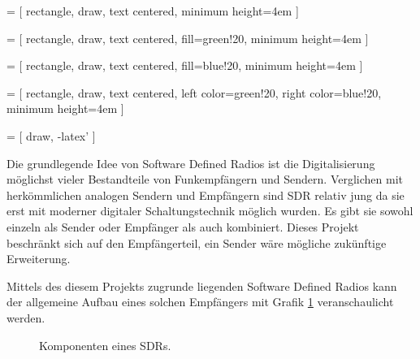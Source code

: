 
 = [
rectangle,
draw,
text centered,
minimum height=4em
]

 = [
rectangle,
draw,
text centered,
fill=green!20,
minimum height=4em
]

 = [
rectangle,
draw,
text centered,
fill=blue!20,
minimum height=4em
]

 = [
rectangle,
draw,
text centered,
left color=green!20,
right color=blue!20,
minimum height=4em
]


 = [
draw,
-latex'
]


Die grundlegende Idee von Software Defined Radios ist die Digitalisierung möglichst vieler Bestandteile von Funkempfängern und Sendern. Verglichen mit herkömmlichen analogen Sendern und Empfängern sind SDR relativ jung da sie erst mit moderner digitaler Schaltungstechnik möglich wurden. Es gibt sie sowohl einzeln als Sender oder Empfänger als auch kombiniert. Dieses Projekt beschränkt sich auf den Empfängerteil, ein Sender wäre mögliche zukünftige Erweiterung.

Mittels des diesem Projekts zugrunde liegenden Software Defined Radios kann der allgemeine Aufbau eines solchen Empfängers mit Grafik \ref{fig:SDR_aufbau} veranschaulicht werden.

\begin{figure}[H]
\begin{center}
    \caption{Komponenten eines SDRs.}
    \label{fig:SDR_aufbau}
\end{center}
\end{figure}

